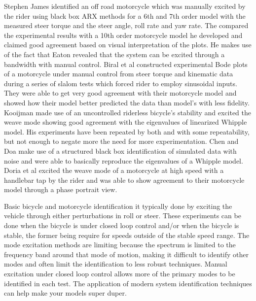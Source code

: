 \documentclass[twocolumn,10pt]{asme2e}
\begin{document}
Stephen James \cite{James2002} identified an off road motorcycle which was
manually excited by the rider using black box ARX methods for a 6th and 7th
order model with the measured steer torque and the steer angle, roll rate and
yaw rate. The compared the experimental results with a 10th order motorcycle
model he developed and claimed good agreement based on visual interpretation of
the plots. He makes use of the fact that Eaton revealed that the system can be
excited through a bandwidth with manual control. Biral et al \cite{Biral2003}
constructed experimental Bode plots of a motorcycle under manual control from
steer torque and kinematic data during a series of slalom tests which forced
rider to employ sinusoidal inputs. They were able to get very good agreement
with their motorcycle model and showed how their model better predicted the
data than model's with less fidelity. Kooijman \cite{Kooijman2006,
Kooijman2009} made use of an uncontrolled riderless bicycle's stability and
excited the weave mode showing good agreement with the eigenvalues of
linearized Whipple model. His experiments have been repeated by both
\cite{Stevens2009} and \cite{Escolona2011} with some repeatability, but not
enough to negate more the need for more experimentation. Chen and Doa
\cite{Chen2010} make use of a structured black box identification of simulated
data with noise and were able to basically reproduce the eigenvalues of a
Whipple model. Doria et al \cite{Doria2012} excited the weave mode of a
motorcycle at high speed with a handlebar tap by the rider and was able to show
agreement to their motorcycle model through a phase portrait view.

Basic bicycle and motorcycle identification it typically done by exciting the
vehicle through either perturbations in roll or steer. These experiments can be
done when the bicycle is under closed loop control and/or when the bicycle is
stable, the former being require for speeds outside of the stable speed range.
The mode excitation methods are limiting because the spectrum is limited to the
frequency band around that mode of motion, making it difficult to identify
other modes and often limit the identification to less robust techniques.
Manual excitation under closed loop control allows more of the primary modes to
be identified in each test. The application of modern system identification
techniques can help make your models super duper.
\end{document}
